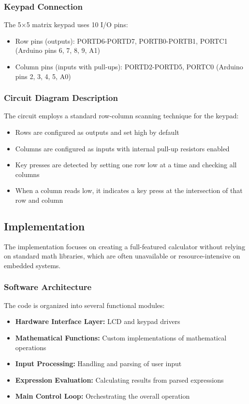 \documentclass[12pt]{article}
\begin{document}
\subsubsection{Keypad Connection}
The 5×5 matrix keypad uses 10 I/O pins:
\begin{itemize}
    \item Row pins (outputs): PORTD6-PORTD7, PORTB0-PORTB1, PORTC1 (Arduino pins 6, 7, 8, 9, A1)
    \item Column pins (inputs with pull-ups): PORTD2-PORTD5, PORTC0 (Arduino pins 2, 3, 4, 5, A0)
\end{itemize}

\subsubsection{Circuit Diagram Description}
The circuit employs a standard row-column scanning technique for the keypad:
\begin{itemize}
    \item Rows are configured as outputs and set high by default
    \item Columns are configured as inputs with internal pull-up resistors enabled
    \item Key presses are detected by setting one row low at a time and checking all columns
    \item When a column reads low, it indicates a key press at the intersection of that row and column
\end{itemize}

\subsection{Implementation}
The implementation focuses on creating a full-featured calculator without relying on standard math libraries, which are often unavailable or resource-intensive on embedded systems.

\subsubsection{Software Architecture}
The code is organized into several functional modules:
\begin{itemize}
    \item \textbf{Hardware Interface Layer:} LCD and keypad drivers
    \item \textbf{Mathematical Functions:} Custom implementations of mathematical operations
    \item \textbf{Input Processing:} Handling and parsing of user input
    \item \textbf{Expression Evaluation:} Calculating results from parsed expressions
    \item \textbf{Main Control Loop:} Orchestrating the overall operation
\end{itemize}
\end{document}
